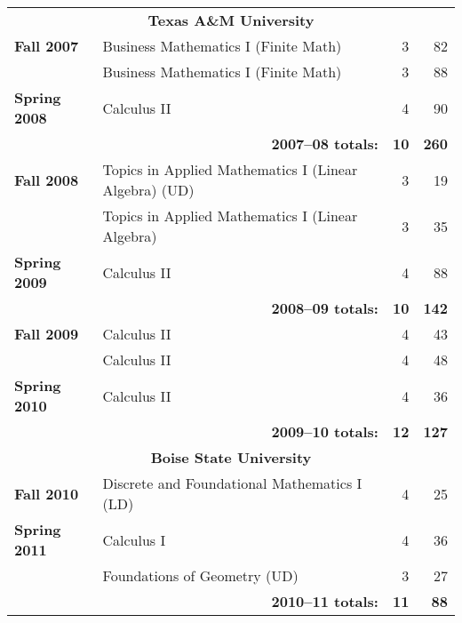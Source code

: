 \documentclass[12pt]{article}
\begin{document}
\begin{center}
\begin{longtable}{@{} l @{\hspace{1ex}} l @{} rr @{}}
\midrule

\multicolumn{4}{c}{\textbf{Texas A\&M University}} \\
\addlinespace[0.1in]

\textbf{Fall 2007} & Business Mathematics I (Finite Math) & 3 & 82 \\
 & Business Mathematics I (Finite Math) & 3 & 88 \\
\addlinespace[0.1in]

\textbf{Spring 2008} & Calculus II & 4 & 90 \\
 \cmidrule{2-4}
 & \multicolumn{1}{r}{\textbf{2007--08 totals:}} & \textbf{10} & \textbf{260} \\
 \cmidrule{2-4}

\textbf{Fall 2008} & Topics in Applied Mathematics I (Linear Algebra) (UD) & 3 & 19 \\
 & Topics in Applied Mathematics I (Linear Algebra) & 3 & 35 \\
\addlinespace[0.1in]

\textbf{Spring 2009} & Calculus II & 4 & 88 \\
 \cmidrule{2-4}
 & \multicolumn{1}{r}{\textbf{2008--09 totals:}} & \textbf{10} & \textbf{142} \\
 \cmidrule{2-4}

\textbf{Fall 2009} & Calculus II & 4 & 43 \\
 & Calculus II & 4 & 48 \\
\addlinespace[0.1in]

\textbf{Spring 2010} & Calculus II & 4 & 36 \\
 \cmidrule{2-4}
 & \multicolumn{1}{r}{\textbf{2009--10 totals:}} & \textbf{12} & \textbf{127} \\

\midrule

\multicolumn{4}{c}{\textbf{Boise State University}} \\
\addlinespace[0.1in]

\textbf{Fall 2010} & Discrete and Foundational Mathematics I (LD) & 4 & 25 \\
\addlinespace[0.1in]

\textbf{Spring 2011} & Calculus I & 4 & 36 \\
 & Foundations of Geometry (UD) & 3 & 27 \\
 \cmidrule{2-4}
 & \multicolumn{1}{r}{\textbf{2010--11 totals:}} & \textbf{11} & \textbf{88} \\
 \cmidrule{2-4}


\end{longtable}
\end{center}
\end{document}
